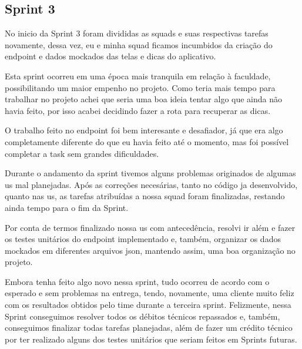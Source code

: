 \subsection{Sprint 3}

No inicio da Sprint 3 foram divididas as squads e suas respectivas tarefas novamente, dessa vez, eu e minha squad ficamos incumbidos da criação do endpoint e dados mockados das telas e dicas do aplicativo.

Esta sprint ocorreu em uma época mais tranquila em relação à faculdade, possibilitando um maior empenho no projeto. Como teria mais tempo para trabalhar no projeto achei que seria uma boa ideia tentar algo que ainda não havia feito, por isso acabei decidindo fazer a rota para recuperar as dicas.

O trabalho feito no endpoint foi bem interesante e desafiador, já que era algo completamente diferente do que eu havia feito até o momento, mas foi possível completar a task sem grandes dificuldades.

Durante o andamento da sprint tivemos alguns problemas originados de algumas \ac{us} mal planejadas. Após as correções necesárias, tanto no código ja desenvolvido, quanto nas \ac{us}, as tarefas atribuídas a nossa squad foram finalizadas, restando ainda tempo para o fim da Sprint.

Por conta de termos finalizado nossa \ac{us} com antecedência, resolvi ir além e fazer os testes unitários do endpoint implementado e, também, organizar os dados mockados em diferentes arquivos json, mantendo assim, uma boa organização no projeto.

Embora tenha feito algo novo nessa sprint, tudo ocorreu de acordo com o esperado e sem problemas na entrega, tendo, novamente, uma cliente muito feliz com os resultados obtidos pelo time durante a terceira sprint. Felizmente, nessa Sprint conseguimos resolver todos os débitos técnicos repassados e, também, conseguimos finalizar todas tarefas planejadas, além de fazer um crédito técnico por ter realizado alguns dos testes unitários que seriam feitos em Sprints futuras.